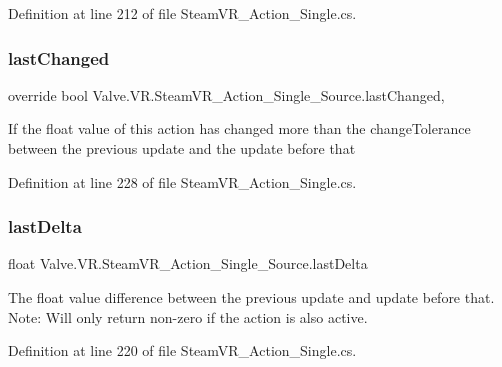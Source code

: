 Definition at line 212 of file Steam\+V\+R\+\_\+\+Action\+\_\+\+Single.\+cs.

\mbox{\label{class_valve_1_1_v_r_1_1_steam_v_r___action___single___source_a29f288991064a3aeedb29fc874e216f9}} 
\subsubsection{\texorpdfstring{lastChanged}{lastChanged}}
{\footnotesize\ttfamily override bool Valve.\+V\+R.\+Steam\+V\+R\+\_\+\+Action\+\_\+\+Single\+\_\+\+Source.\+last\+Changed\hspace{0.3cm}{\ttfamily [get]}, {}}



If the float value of this action has changed more than the change\+Tolerance between the previous update and the update before that 



Definition at line 228 of file Steam\+V\+R\+\_\+\+Action\+\_\+\+Single.\+cs.

\mbox{\label{class_valve_1_1_v_r_1_1_steam_v_r___action___single___source_a85d7a7ecd8610d667532340eb3cc0200}} 
\subsubsection{\texorpdfstring{lastDelta}{lastDelta}}
{\footnotesize\ttfamily float Valve.\+V\+R.\+Steam\+V\+R\+\_\+\+Action\+\_\+\+Single\+\_\+\+Source.\+last\+Delta\hspace{0.3cm}{\ttfamily [get]}}



The float value difference between the previous update and update before that. Note\+: Will only return non-\/zero if the action is also active. 



Definition at line 220 of file Steam\+V\+R\+\_\+\+Action\+\_\+\+Single.\+cs.



